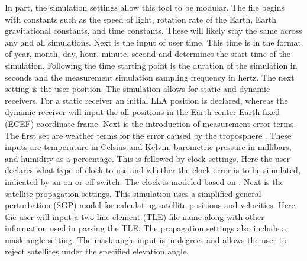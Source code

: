 \documentclass[12pt]{report}
\begin{document}
In part, the simulation settings allow this tool to be modular. The file begins with constants such as the speed of light, rotation rate of the Earth, Earth gravitational constants, and time constants. These will likely stay the same across any and all simulations. Next is the input of user time. This time is in the format of year, month, day, hour, minute, second and determines the start time of the simulation. Following the time starting point is the duration of the simulation in seconds and the measurement simulation sampling frequency in hertz. The next setting is the user position. The simulation allows for static and dynamic receivers. For a static receiver an initial LLA position is declared, whereas the dynamic receiver will input the all positions in the Earth center Earth fixed (ECEF) coordinate frame. Next is the introduction of measurement error terms. The first set are weather terms for the error caused by the troposphere \cite{misraGlobalPositioningSystem2012}. These inputs are temperature in Celsius and Kelvin, barometric pressure in millibars, and humidity as a percentage. This is followed by clock settings. Here the user declares what type of clock to use and whether the clock error is to be simulated, indicated by an on or off switch. The clock is modeled based on \cite{brown_introduction_2012}. Next is the satellite propagation settings. This simulation uses a simplified general perturbation (SGP) model for calculating satellite positions and velocities. Here the user will input a two line element (TLE) file name along with other information used in parsing the TLE. The propagation settings also include a mask angle setting. The mask angle input is in degrees and allows the user to reject satellites under the specified elevation angle.
\end{document}
